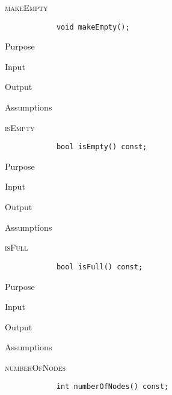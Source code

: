 \documentclass[pdftex, 12pt]{article}
\begin{document}
\begin{description}
	\item{\textsc{makeEmpty}}
		\begin{lstlisting}
			void makeEmpty();
		\end{lstlisting}
		\begin{description}

			\item{Purpose}

			\item{Input}

			\item{Output}

			\item{Assumptions}

		\end{description}
	\item{\textsc{isEmpty}}
		\begin{lstlisting}
			bool isEmpty() const;
		\end{lstlisting}
		\begin{description}

			\item{Purpose}

			\item{Input}

			\item{Output}

			\item{Assumptions}

		\end{description}
	\item{\textsc{isFull}}
		\begin{lstlisting}
			bool isFull() const;
		\end{lstlisting}
		\begin{description}

			\item{Purpose}

			\item{Input}

			\item{Output}

			\item{Assumptions}

		\end{description}
	\item{\textsc{numberOfNodes}}
		\begin{lstlisting}
			int numberOfNodes() const;
		\end{lstlisting}
		\begin{description}


\end{description}
\end{description}
\end{document}
